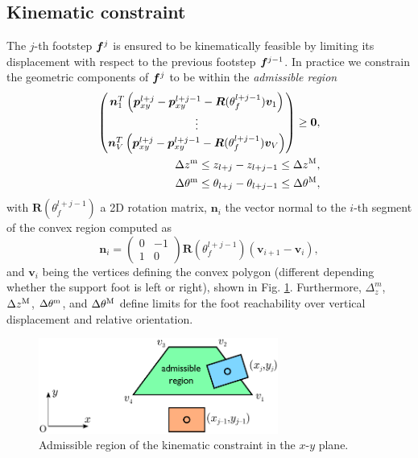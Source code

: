 \subsection{Kinematic constraint}
The $j$-th footstep ${\bm{f}}^{j}$ is ensured to be kinematically feasible by
limiting its displacement with respect to the previous footstep ${\bm{f}}^{j-1}$.
In practice we constrain the geometric components of ${\bm{f}}^{j}$ to be within
the \textit{admissible region}
\begin{equation}
\label{eq:FAPA:kinematic-constraint}
\begin{split}
\begin{pmatrix}
    \bm{n}_1^T\left(\bm{p}_{xy}^{l+j} - \bm{p}_{xy}^{l+j-1} - \bm{R}(\theta_f^{l+j-1})\bm{v}_1\right) \\
    \vdots \\
    \bm{n}_V^T\left(\bm{p}_{xy}^{l+j} - \bm{p}_{xy}^{l+j-1} - \bm{R}(\theta_f^{l+j-1})\bm{v}_V\right) \\
\end{pmatrix} \ge \bm{0},\\
    \Delta z^{\rm m} \le z_{l+j} - z_{l+j-1} \le \Delta z^{\rm M}, \\
    \Delta \theta^{\rm m} \le \theta_{l+j} - \theta_{l+j-1} \le \Delta \theta^{\rm M}, 
\end{split}
\end{equation}
with $\bm{R}(\theta_f^{l+j-1})$ a 2D rotation matrix, $\bm{n}_i$ the vector
normal to the $i$-th segment of the convex region computed as
\begin{equation*}
    \bm{n}_i =
    \begin{pmatrix}
        0 & -1 \\ 1 & 0
    \end{pmatrix}
    \bm{R}(\theta_f^{l+j-1})(\bm{v}_{i+1}-\bm{v}_i),
\end{equation*}
and $\bm{v}_i$ being the vertices defining the convex polygon (different
depending whether the support foot is left or right), shown in
Fig. \ref{fig:FAPA:kinematic-constraint}. Furthermore,
$\Delta_z^m$, $\Delta z^{\rm M}$, $\Delta \theta^{\rm m}$, and
$\Delta \theta^{\rm M}$ define limits for the foot reachability over vertical
displacement and relative orientation.

\begin{figure}
    \centering
    \includegraphics[width=0.7\textwidth]{figures/humanoids_kinconstr.pdf}
    \caption{Admissible region of the kinematic constraint in the $x$-$y$ plane.}
    \label{fig:FAPA:kinematic-constraint}
\end{figure}


